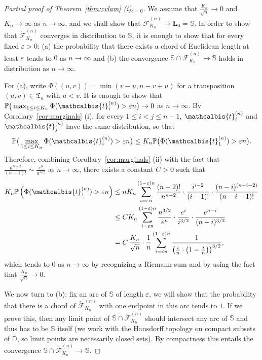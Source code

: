 \documentclass[AHL,XML,longabstracts,Unicode]{cedram}
\newcommand{\D}{\mathbb{D}}
\def\S{\mathbb{S}}
\def\eps{\varepsilon}
\def\dFKn{\dot{\mathcal{F}}^{(n)}_{K_{n}}}
\def\tb{\mathcalbis{t}}
\renewcommand{\epsilon}{\varepsilon}
\renewcommand\Pr[1]{\mathbb{P}\left(#1\right)}
\newcommand\Prb[1]{\mathbb{P}\big(#1\big)}
\begin{document}
\begin{proof}[Partial proof of Theorem~\ref{thm:cvlam} (i)$_{c=0}$] We assume  that $ \frac{K_{n}}{\sqrt{n}} \rightarrow 0$ and $K_{n} \rightarrow \infty$ as $n \rightarrow \infty$, and we shall show that $\dFKn \rightarrow \mathbf{L}_{0}=\mathbb{S}$. In order to show that $\dFKn $ converges in distribution to $ \S$, it is enough to show that for every fixed $\epsilon>0$: (a) the probability that there exists a chord of Euclidean length at least $\epsilon$ tends to $0$ as $n \rightarrow \infty$ and (b) the convergence $\S \cap \dFKn \rightarrow \S$ holds in distribution as $n \rightarrow \infty$.


For (a), write $ \Phi( (u,v))=\min(v-u,n-v+u)$ for a transposition $(u,v) \in \mathfrak T_n$ with $u<v$.
It is enough to show that $\Prb{\max_{1 \leq i \leq K_{n}} \Phi(\tb_{i}^{(n)}) > \epsilon n} \rightarrow 0$ as $n \rightarrow \infty$. By Corollary~\ref{cor:marginals} (i), for every $1 \leq i<j \leq n-1$, $\tb_{i}^{(n)}$ and $\tb_{j}^{(n)}$ have the same distribution, so that
$$\Prb{\max_{1 \leq i \leq K_{n}} \Phi(\tb_{i}^{(n)}) > \epsilon n} \leq K_{n} \Prb{\Phi(\tb_{1}^{(n)})>\epsilon n}.$$
Therefore, combining Corollary~\ref{cor:marginals} (ii) with the fact that  $ \frac{n^{n-2}}{(n-1)!} \sim  \tfrac{e^{n}}{n^{3/2}}$ as $ n \rightarrow \infty$, there exists a constant $C>0$ such that
\begin{align*}
K_{n} \Pr{\Phi(\tb_{1}^{(n)})>\epsilon n} & \leq  n K_{n} \sum_{i=  \epsilon n}^{ (1-\epsilon)n}  \frac{(n-2)!}{n^{n-2}} \cdot \frac{i^{i-2}}{(i-1)!} \cdot \frac{(n-i)^{(n-i-2)}}{(n-i-1)!}\\
& \leq  C  K_{n}  \sum_{i=  \epsilon n}^{ (1-\epsilon)n}   \frac{n^{3/2}}{e^{n}} \cdot  \frac{e^{i}}{i^{3/2}} \cdot  \frac{e^{n-i}}{(n-i)^{3/2}} \\
& =  C\, \frac{K_{n}}{\sqrt{n}} \cdot \frac{1}{n}    \sum_{i=  \epsilon n}^{ (1-\epsilon)n}  \frac{1}{ \left( \frac{i}{n} \cdot \left( 1- \frac{i}{n} \right)   \right) ^{3/2}},
\end{align*}
which tends to $0$ as $ n \rightarrow \infty$ by recognizing a Riemann sum and by using the fact that $\tfrac{K_{n}}{\sqrt{n}} \rightarrow 0$.

We now turn to (b):
fix an arc of $\S$ of length $\eps$, we will show that the probability
that there is a chord of $\dFKn$ with one endpoint in this arc tends to $1$.
If we prove this, then any limit point of $\S \cap \dFKn$ should intersect any arc of $\S$
and thus has to be $\S$ itself (we work with the Hausdorff topology on compact subsets of $\overline{\D}$, so limit points are necessarily closed sets).
By compactness this entails the convergence $\S \cap \dFKn \to \S$.


\end{proof}
\end{document}
